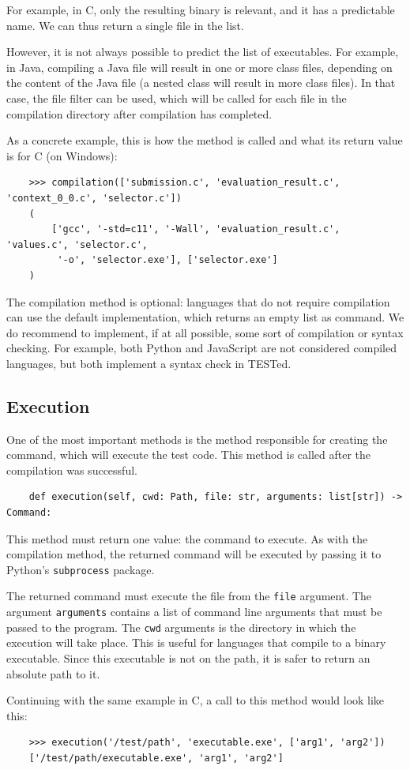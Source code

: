 \documentclass[../main]{subfiles}
\begin{document}
For example, in C, only the resulting binary is relevant, and it has a predictable name.
We can thus return a single file in the list.

However, it is not always possible to predict the list of executables.
For example, in Java, compiling a Java file will result in one or more class files, depending on the content of the Java file (a nested class will result in more class files).
In that case, the file filter can be used, which will be called for each file in the compilation directory after compilation has completed.

As a concrete example, this is how the method is called and what its return value is for C (on Windows):

\begin{verbatim}
    >>> compilation(['submission.c', 'evaluation_result.c', 'context_0_0.c', 'selector.c'])
    (
        ['gcc', '-std=c11', '-Wall', 'evaluation_result.c', 'values.c', 'selector.c',
         '-o', 'selector.exe'], ['selector.exe']
    )
\end{verbatim}

The compilation method is optional: languages that do not require compilation can use the default implementation, which returns an empty list as command.
We do recommend to implement, if at all possible, some sort of compilation or syntax checking.
For example, both Python and JavaScript are not considered compiled languages, but both implement a syntax check in TESTed.

\subsection{Execution}\label{subsec:impl-execution}

One of the most important methods is the method responsible for creating the command, which will execute the test code.
This method is called after the compilation was successful.

\begin{verbatim}
    def execution(self, cwd: Path, file: str, arguments: list[str]) -> Command:
\end{verbatim}

This method must return one value: the command to execute.
As with the compilation method, the returned command will be executed by passing it to Python's \texttt{subprocess} package.

The returned command must execute the file from the \texttt{file} argument.
The argument \texttt{arguments} contains a list of command line arguments that must be passed to the program.
The \texttt{cwd} arguments is the directory in which the execution will take place.
This is useful for languages that compile to a binary executable.
Since this executable is not on the path, it is safer to return an absolute path to it.

Continuing with the same example in C, a call to this method would look like this:

\begin{verbatim}
    >>> execution('/test/path', 'executable.exe', ['arg1', 'arg2'])
    ['/test/path/executable.exe', 'arg1', 'arg2']
\end{verbatim}
\end{document}
